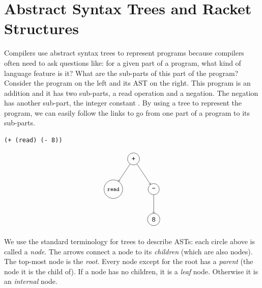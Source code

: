 \documentclass[11pt]{book}
\begin{document}
\section{Abstract Syntax Trees and Racket Structures}
\label{sec:ast}

Compilers use abstract syntax trees to represent programs because
compilers often need to ask questions like: for a given part of a
program, what kind of language feature is it? What are the sub-parts
of this part of the program? Consider the program on the left and its
AST on the right. This program is an addition and it has two
sub-parts, a read operation and a negation. The negation has another
sub-part, the integer constant . By using a tree to represent
the program, we can easily follow the links to go from one part of a
program to its sub-parts.
\begin{center}
\begin{minipage}{0.4\textwidth}
\begin{lstlisting}
(+ (read) (- 8))
\end{lstlisting}
\end{minipage}
\begin{minipage}{0.4\textwidth}
\begin{equation}
\begin{tikzpicture}
 \node[draw, circle] (plus)  at (0 ,  0) {\key{+}};
 \node[draw, circle] (read)  at (-1, -1.5) {{\footnotesize\key{read}}};
 \node[draw, circle] (minus) at (1 , -1.5) {$\key{-}$};
 \node[draw, circle] (8)     at (1 , -3) {\key{8}};

 \draw[->] (plus) to (read);
 \draw[->] (plus) to (minus);
 \draw[->] (minus) to (8);
\end{tikzpicture}
\label{eq:arith-prog}
\end{equation}
\end{minipage}
\end{center}
We use the standard terminology for trees to describe ASTs: each
circle above is called a \emph{node}. The arrows connect a node to its
\emph{children} (which are also nodes). The top-most node is the
\emph{root}.  Every node except for the root has a \emph{parent} (the
node it is the child of). If a node has no children, it is a
\emph{leaf} node.  Otherwise it is an \emph{internal} node.
\end{document}
